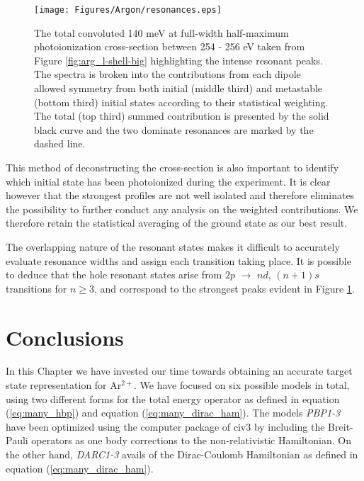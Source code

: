 \begin{figure}
\centering
\texttt{[image: Figures/Argon/resonances.eps]}
\caption{The total convoluted 140 meV at full-width half-maximum photoionization cross-section between 254 - 256 eV taken from Figure \ref{fig:arg_l-shell-big} highlighting the intense resonant peaks. The spectra is broken into the contributions from each dipole allowed symmetry from both initial (middle third) and metastable (bottom third) initial states according to their statistical weighting. The total (top third) summed contribution is presented by the solid black curve and the two dominate resonances are marked by the dashed line. \label{fig:arg_l-shell-resonance}}
\end{figure}

This method of deconstructing the cross-section is also important to identify which initial state has been photoionized during the experiment. It is clear however that the strongest profiles are not well isolated and therefore eliminates the possibility to further conduct any analysis on the weighted contributions. We therefore retain the statistical averaging of the ground state as our best result.

The overlapping nature of the resonant states makes it difficult to accurately evaluate resonance widths and assign each transition taking place. It is possible to deduce that the hole resonant states arise from $2p$ $\rightarrow$ $nd$, $(n+1)s$ transitions for $n\ge3$, and correspond to the strongest peaks evident in Figure \ref{fig:arg_l-shell-resonance}.



\section{Conclusions}\label{sec:arg_conclusions}
In this Chapter we have invested our time towards obtaining an accurate target state representation for Ar$^{2+}$. We have focused on six possible models in total, using two different forms for the total energy operator as defined in equation (\ref{eq:many_hbp}) and equation (\ref{eq:many_dirac_ham}). The models \textit{PBP1-3} have been optimized using the computer package of {\sc civ3} by including the Breit-Pauli operators as one body corrections to the non-relativistic Hamiltonian. On the other hand, \textit{DARC1-3} avails of the Dirac-Coulomb Hamiltonian as defined in equation (\ref{eq:many_dirac_ham}). 

